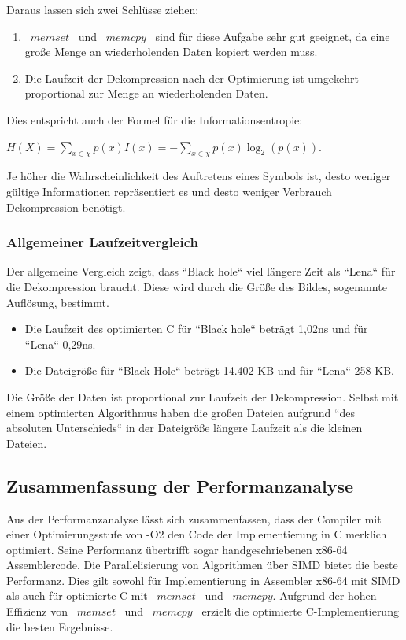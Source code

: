 \documentclass[course=erap]{aspdoc}
\begin{document}
    \newline
    Daraus lassen sich zwei Schlüsse ziehen:
    \begin{enumerate}
        \item \ $memset$ \ und \ $memcpy$ \ sind für diese Aufgabe sehr gut geeignet,
        da eine große Menge an wiederholenden Daten kopiert werden muss.
        \item Die Laufzeit der Dekompression nach der Optimierung ist umgekehrt proportional zur
        Menge an wiederholenden Daten.
    \end{enumerate}
    \noindent Dies entspricht auch der Formel für die Informationsentropie: \ \cite{grnvsSlides}
    \begin{center}
        $ H(X) = \sum_{x\in\chi}^{}p(x)I(x) = -\sum_{x\in\chi}^{}p(x)\log_2(p(x))$.
    \end{center}
    \noindent Je höher die Wahrscheinlichkeit des Auftretens eines Symbols ist, desto weniger gültige Informationen repräsentiert
    es und desto weniger Verbrauch Dekompression benötigt.

    \subsubsection{Allgemeiner Laufzeitvergleich}\label{subsubsec:allgemeiner-laufzeitvergleich}

    Der allgemeine Vergleich zeigt, dass ``Black hole`` viel längere Zeit als ``Lena`` für die
    Dekompression braucht.
    Diese wird durch die Größe des Bildes, sogenannte Auflösung, bestimmt.
    \begin{itemize}
        \item Die Laufzeit des optimierten C für ``Black hole`` beträgt 1,02ns und für ``Lena`` 0,29ns.
        \item Die Dateigröße für ``Black Hole`` beträgt 14.402 KB und für ``Lena`` 258 KB\@.
    \end{itemize}
    \noindent Die Größe der Daten ist proportional zur Laufzeit der Dekompression.
    Selbst mit einem optimierten Algorithmus haben die großen Dateien aufgrund ``des absoluten Unterschieds``
    in der Dateigröße längere Laufzeit als die kleinen Dateien.

    \subsection{Zusammenfassung der Performanzanalyse}\label{subsec:zusammenfassung-der-performanzanalyse}
    Aus der Performanzanalyse lässt sich zusammenfassen, dass der Compiler mit einer Optimierungsstufe von -O2 den
    Code der Implementierung in C merklich optimiert.
    Seine Performanz übertrifft sogar handgeschriebenen x86-64 Assemblercode.
    Die Parallelisierung von Algorithmen über SIMD bietet die beste Performanz.
    Dies gilt sowohl für Implementierung in Assembler x86-64 mit SIMD als auch für optimierte
    C mit \ $memset$ \ und \ $memcpy$.
    Aufgrund der hohen Effizienz von \ $memset$ \ und \ $memcpy$ \ erzielt die optimierte C-Implementierung
    die besten Ergebnisse.
\end{document}
